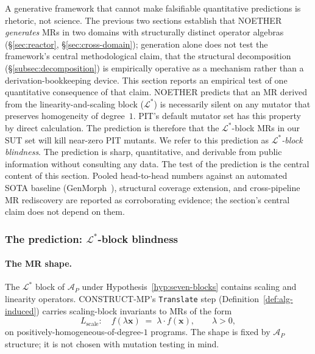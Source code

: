 \documentclass[manuscript]{acmart}
\begin{document}
A generative framework that cannot make falsifiable quantitative
predictions is rhetoric, not science. The previous two sections
establish that NOETHER \emph{generates} MRs in two domains with
structurally distinct operator algebras (\S\ref{sec:reactor},
\S\ref{sec:cross-domain}); generation alone does not test the
framework's central methodological claim, that the structural
decomposition (\S\ref{subsec:decomposition}) is empirically operative
as a mechanism rather than a derivation-bookkeeping device. This
section reports an empirical test of one quantitative consequence of
that claim. NOETHER predicts that an MR derived from the
linearity-and-scaling block ($\mathcal{L}^{*}$) is necessarily silent
on any mutator that preserves homogeneity of degree~$1$. PIT's default
mutator set has this property by direct calculation. The prediction
is therefore that the $\mathcal{L}^{*}$-block MRs in our SUT set will
kill near-zero PIT mutants. We refer to this prediction as
\emph{$\mathcal{L}^{*}$-block blindness}. The prediction is sharp,
quantitative, and derivable from public information without consulting
any data. The test of the prediction is the central content of this
section. Pooled head-to-head numbers against an automated SOTA
baseline (GenMorph~\cite{GenMorph2024}), structural coverage
extension, and cross-pipeline MR rediscovery are reported as
corroborating evidence; the section's central claim does not depend
on them.

\subsubsection{The prediction: \texorpdfstring{$\mathcal{L}^{*}$}{L*}-block blindness}
\label{subsec:l-blindness-derivation}

\paragraph{The MR shape.}
The $\mathcal{L}^{*}$ block of $\mathcal{A}_P$ under
Hypothesis~\ref{hyp:seven-blocks} contains scaling and linearity
operators. CONSTRUCT-MP's \texttt{Translate} step
(Definition~\ref{def:alg-induced}) carries scaling-block invariants
to MRs of the form
\begin{equation}
\label{eq:l-scale-shape}
L_{\mathrm{scale}}: \quad f(\lambda \mathbf{x}) \;=\; \lambda \cdot f(\mathbf{x}),
\qquad \lambda > 0,
\end{equation}
on positively-homogeneous-of-degree-$1$ programs. The shape is fixed
by $\mathcal{A}_P$ structure; it is not chosen with mutation testing
in mind.
\end{document}
